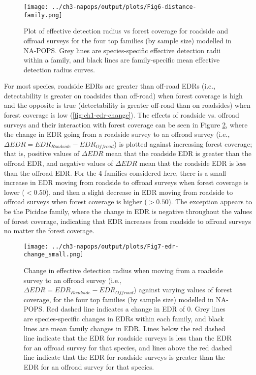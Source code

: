 \begin{figure}[h]
	\centering
	\texttt{[image: ../ch3-napops/output/plots/Fig6-distance-family.png]}
	\caption{\label{fig:ch1-distance-family}Plot of effective detection radius vs forest coverage for roadside and offroad surveys for the four top families (by sample size) modelled in NA-POPS. Grey lines are species-specific effective detection radii within a family, and black lines are family-specific mean effective detection radius curves.}
\end{figure}

\par For most species, roadside EDRs are greater than off-road EDRs (i.e., detectability is greater on roadsides than off-road) when forest coverage is high and the opposite is true (detectability is greater off-road than on roadsides) when forest coverage is low (\autoref{fig:ch1-edr-change}). The effects of roadside vs. offroad surveys and their interaction with forest coverage can be seen in Figure \ref{fig:ch1-edr-change}, where the change in EDR going from a roadside survey to an offroad survey (i.e., $\Delta EDR = EDR_{Roadside} - EDR_{Offroad}$) is plotted against increasing forest coverage; that is, positive values of $\Delta EDR$ mean that the roadside EDR is greater than the offroad EDR, and negative values of $\Delta EDR$ mean that the roadside EDR is less than the offroad EDR. For the 4 families considered here, there is a small increase in EDR moving from roadside to offroad surveys when forest coverage is lower ($< 0.50$), and then a slight decrease in EDR moving from roadside to offroad surveys when forest coverage is higher ($> 0.50$). The exception appears to be the Picidae family, where the change in EDR is negative throughout the values of forest coverage, indicating that EDR increases from roadside to offroad surveys no matter the forest coverage.

\begin{figure}[hbtp]
	\centering
	\texttt{[image: ../ch3-napops/output/plots/Fig7-edr-change\_small.png]}
	\caption{\label{fig:ch1-edr-change}Change in effective detection radius when moving from a roadside survey to an offroad survey (i.e., $\Delta EDR = EDR_{Roadside} - EDR_{Offroad}$) against varying values of forest coverage, for the four top families (by sample size) modelled in NA-POPS. Red dashed line indicates a change in EDR of 0. Grey lines are species-specific changes in EDRs within each family, and black lines are mean family changes in EDR. Lines below the red dashed line indicate that the EDR for roadside surveys is less than the EDR for an offroad survey for that species, and lines above the red dashed line indicate that the EDR for roadside surveys is greater than the EDR for an offroad survey for that species.}
\end{figure}

